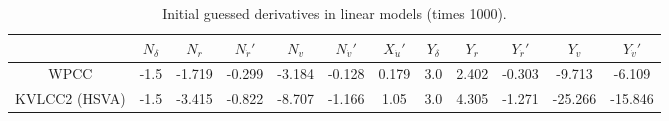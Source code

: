 \begin{table}[h]
    \scriptsize
    \caption{Initial guessed derivatives in linear models (times 1000).}
    \label{tab:initial}
    \begin{tabular}{|c|c|c|c|c|c|c|c|c|c|c|c|}
\hline
 & 

\( N_{\delta} \)
& 

\( N_{r} \)
& 

\( N_{\dot{r}}' \)
& 

\( N_{v} \)
& 

\( N_{\dot{v}}' \)
& 

\( X_{\dot{u}}' \)
& 

\( Y_{\delta} \)
& 

\( Y_{r} \)
& 

\( Y_{\dot{r}}' \)
& 

\( Y_{v} \)
& 

\( Y_{\dot{v}}' \)
\\
\hline

WPCC
&

-1.5
&

-1.719
&

-0.299
&

-3.184
&

-0.128
&

0.179
&

3.0
&

2.402
&

-0.303
&

-9.713
&

-6.109
\\

KVLCC2 (HSVA)
&

-1.5
&

-3.415
&

-0.822
&

-8.707
&

-1.166
&

1.05
&

3.0
&

4.305
&

-1.271
&

-25.266
&

-15.846
\\
\hline
\end{tabular}

\end{table}

